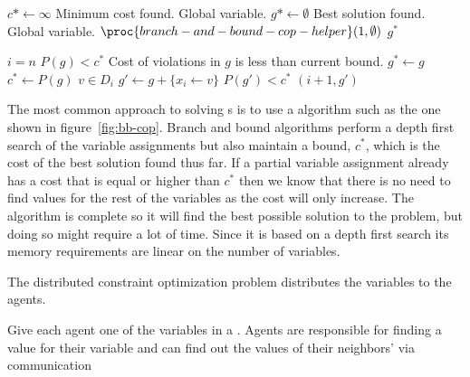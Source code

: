 \begin{SCfigure}
  \begin{minipage}{1.0\linewidth}
    \begin{codebox}
      \li $c* \gets \infty$ \>\>\>\Comment Minimum cost found. Global variable.
      \li $g* \gets \emptyset$ \>\>\>\Comment Best solution found. Global
      variable.
      \li $\proc{branch-and-bound-cop-helper}(1,\emptyset)$
      \li \Return $g^*$
    \end{codebox}
    \begin{codebox}
    \li \If $i = n$ 
    \li \Then \If $P(g) < c^*$ \Comment Cost of violations in $g$ is
    less than current bound.
    \li       \Then $g^* \gets g$
    \li             $c^* \gets P(g)$
              \End
    \li       \Return
        \End              
    \li \For $v \in D_i$ 
    \li \Do $g' \gets g + \{x_i \gets v\}$
    \li     \If $P(g') < c^*$
    \li     \Then {}$(i+1, g')$
            \End
        \End
  \end{codebox}
  \end{minipage}
  \caption{A centralized branch and bound algorithm for constraint
    optimization. It assumes there are $n$ variables,
    $x_1,\ldots,x_n$, and that $P(g)$ returns the total of any
    constraint violations given partial assignment $g$ and constraints
    $P$.}
  \label{fig:bb-cop}
\end{SCfigure}

The most common approach to solving s is to use a  algorithm such as the one shown in figure~\ref{fig:bb-cop}.
Branch and bound algorithms perform a depth first search of the
variable assignments but also maintain a bound, $c^*$, which is the
cost of the best solution found thus far. If a partial variable
assignment already has a cost that is equal or higher than $c^*$ then
we know that there is no need to find values for the rest of the
variables as the cost will only increase. The algorithm is complete so
it will find the best possible solution to the problem, but doing so
might require a lot of time. Since it is based on a depth first search
its memory requirements are linear on the number of
variables. 

The distributed constraint optimization problem distributes the
variables to the agents.

\begin{definition}
  Give each agent one of the variables in a . Agents are
  responsible for finding a value for their variable and can find
  out the values of their neighbors' via communication
\end{definition}

